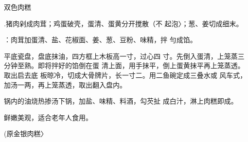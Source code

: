 \begin{recipe}{双色肉糕}

\ingredients


\cooking

\step .猪肉剁成肉茸；鸡蛋破壳，蛋清、蛋黄分开搅散（不 起泡〉；葱、姜切成细末。

\step ：肉茸加蛋清、盐、花椒面、姜、葱、豆粉、味精，拌 勻成馅。

\step 平底瓷盘，盘底抹油，四方框上木板高一寸，过心四 寸。先倒入蛋清，上笼蒸三分钟至熟。即将拌好的馅倒在蛋 清上面，用手抹平，倒上蛋黄抹平再上笼蒸透。取出启去底 板晾冷，切成大骨牌片，长一寸二。用二鱼碗定成三叠水或 风车式，加汤一两，再上笼蒸透，取出翻入盘内。

\step 锅内的油烧热掺汤下锅，加盐、味精、料酒，勾芡扯 成白汁，淋上肉糕即成。

\notes

鲜嫩美观，适合老年人食用。

(原金银肉糕〉

\end{recipe}

